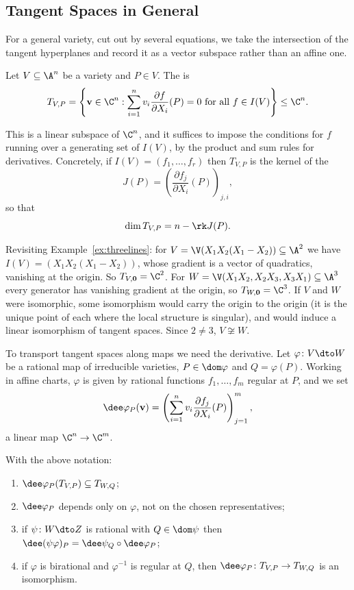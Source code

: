 \subsection{Tangent Spaces in General}

For a general variety, cut out by several equations, we take the intersection of the tangent hyperplanes and record it as a vector subspace rather than an affine one.

\begin{definition}
	Let $V \subseteq \A^n$ be a variety and $P \in V$. The  is
	$$T_{V,P} = \left\{\mathbf v \in \C^n : \sum_{i=1}^n v_i \frac{\partial f}{\partial X_i}(P) = 0 \text{ for all } f \in I(V)\right\} \leq \C^n.$$
\end{definition}

This is a linear subspace of $\C^n$, and it suffices to impose the conditions for $f$ running over a generating set of $I(V)$, by the product and sum rules for derivatives. Concretely, if $I(V) = (f_1,\dots,f_r)$ then $T_{V,P}$ is the kernel of the 
$$J(P) = \left(\frac{\partial f_j}{\partial X_i}(P)\right)_{j,i},$$
so that
$$\dim T_{V,P} = n - \rk J(P).$$

\begin{example}
	Revisiting Example~\ref{ex:threelines}: for $V = \V(X_1X_2(X_1-X_2)) \subseteq \A^2$ we have $I(V) = (X_1X_2(X_1-X_2))$, whose gradient is a vector of quadratics, vanishing at the origin. So $T_{V,\mathbf 0} = \C^2$. For $W = \V(X_1X_2,X_2X_3,X_3X_1) \subseteq \A^3$ every generator has vanishing gradient at the origin, so $T_{W,\mathbf 0} = \C^3$. If $V$ and $W$ were isomorphic, some isomorphism would carry the origin to the origin (it is the unique point of each where the local structure is singular), and would induce a linear isomorphism of tangent spaces. Since $2 \neq 3$, $V \not\cong W$.
\end{example}

To transport tangent spaces along maps we need the derivative. Let $\varphi \colon V \dto W$ be a rational map of irreducible varieties, $P \in \dom\varphi$ and $Q = \varphi(P)$. Working in affine charts, $\varphi$ is given by rational functions $f_1,\dots,f_m$ regular at $P$, and we set
$$\dee\varphi_P(\mathbf v) = \left(\sum_{i=1}^n v_i \frac{\partial f_j}{\partial X_i}(P)\right)_{j=1}^m,$$
a linear map $\C^n \to \C^m$.

\begin{proposition}\label{prop:dvarphi}
	With the above notation:
	\begin{enumerate}[label=(\roman*)]
		\item $\dee\varphi_P(T_{V,P}) \subseteq T_{W,Q}$;
		\item $\dee\varphi_P$ depends only on $\varphi$, not on the chosen representatives;
		\item if $\psi \colon W \dto Z$ is rational with $Q \in \dom\psi$ then $\dee(\psi\varphi)_P = \dee\psi_Q \circ \dee\varphi_P$;
		\item if $\varphi$ is birational and $\varphi^{-1}$ is regular at $Q$, then $\dee\varphi_P \colon T_{V,P} \to T_{W,Q}$ is an isomorphism.
	\end{enumerate}
\end{proposition}

